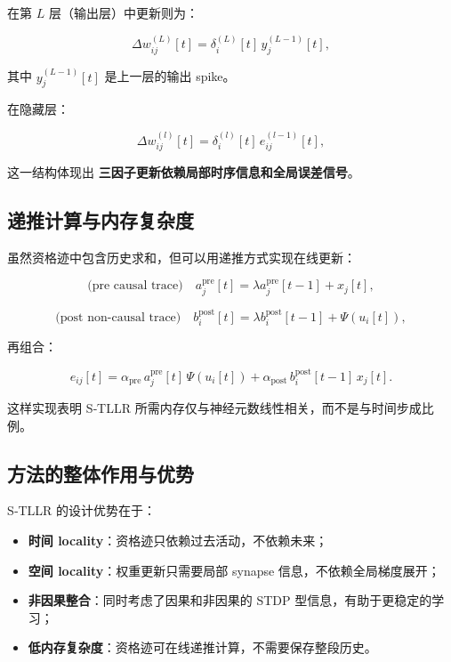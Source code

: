 \documentclass[journal,12pt,onecolumn]{IEEEtran}
\begin{document}
在第 $L$ 层（输出层）中更新则为：

\begin{equation}
\Delta w_{ij}^{(L)}[t] = \delta_i^{(L)}[t] \, y_j^{(L-1)}[t],
\end{equation}

其中 $y_j^{(L-1)}[t]$ 是上一层的输出 spike。

在隐藏层：

\begin{equation}
\Delta w_{ij}^{(l)}[t] = \delta_i^{(l)}[t] \, e_{ij}^{(l-1)}[t],
\end{equation}

这一结构体现出 \textbf{三因子更新依赖局部时序信息和全局误差信号}。

\subsection{递推计算与内存复杂度}

虽然资格迹中包含历史求和，但可以用递推方式实现在线更新：

\begin{equation}
\text{(pre causal trace)}\quad a_{j}^{\text{pre}}[t] = \lambda a_{j}^{\text{pre}}[t-1] + x_j[t],
\end{equation}

\begin{equation}
\text{(post non‑causal trace)}\quad b_{i}^{\text{post}}[t] = \lambda b_{i}^{\text{post}}[t-1] + \Psi(u_i[t]),
\end{equation}

再组合：

\begin{equation}
e_{ij}[t] = \alpha_{\text{pre}}\,a_{j}^{\text{pre}}[t]\,\Psi(u_i[t])
+
\alpha_{\text{post}}\,b_{i}^{\text{post}}[t-1]\,x_j[t].
\end{equation}

这样实现表明 S‑TLLR 所需内存仅与神经元数线性相关，而不是与时间步成比例。

\subsection{方法的整体作用与优势}

S‑TLLR 的设计优势在于：

\begin{itemize}
    \item \textbf{时间 locality}：资格迹只依赖过去活动，不依赖未来；
    \item \textbf{空间 locality}：权重更新只需要局部 synapse 信息，不依赖全局梯度展开；
    \item \textbf{非因果整合}：同时考虑了因果和非因果的 STDP 型信息，有助于更稳定的学习；
    \item \textbf{低内存复杂度}：资格迹可在线递推计算，不需要保存整段历史。
\end{itemize}
\end{document}
